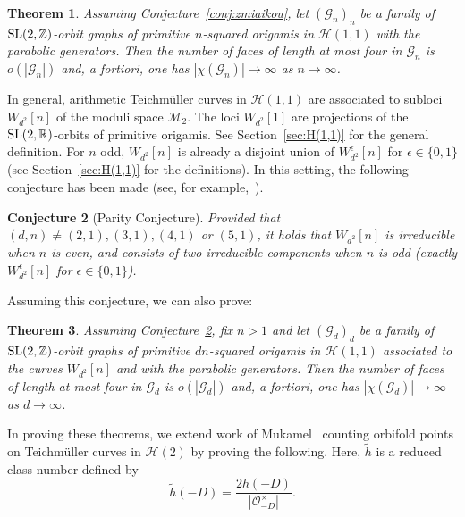 \documentclass[a4paper,11pt]{amsart}
\numberwithin{equation}{section}
\numberwithin{figure}{section}
\numberwithin{table}{section}
\newtheorem{theorem}{Theorem}[section]
\newtheorem{conjecture}[theorem]{Conjecture}
\newcommand{\teichmuller}{Teichm{\"u}ller }
\newcommand{\calH}{\mathcal{H}}
\newcommand{\Z}{\mathbb{Z}}
\newcommand{\R}{\mathbb{R}}
\DeclareMathOperator{\SL}{{\rm{SL}}}
\begin{document}
\begin{theorem}\label{thm:submain-2}
    Assuming Conjecture~\ref{conj:zmiaikou}, let $(\mathcal{G}_{n})_{n}$ be a family of $\SL(2,\Z)$-orbit graphs of primitive $n$-squared origamis in $\mathcal{H}(1,1)$ with the parabolic generators. Then the number of faces of length at most four in $\mathcal{G}_{n}$ is $o(|\mathcal{G}_{n}|)$ and, \emph{a fortiori}, one has $|\chi(\mathcal{G}_{n})|\to\infty$ as $n\to\infty$. 
\end{theorem}

In general, arithmetic \teichmuller curves in $\calH(1,1)$ are associated to subloci $W_{d^2}[n]$ of the moduli space $\mathcal{M}_{2}$. The loci $W_{d^{2}}[1]$ are projections of the $\SL(2,\R)$-orbits of primitive origamis. See Section~\ref{sec:H(1,1)} for the general definition. For $n$ odd, $W_{d^2}[n]$ is already a disjoint union of $W_{d^2}^{\epsilon}[n]$ for $\epsilon\in\{0,1\}$ (see Section~\ref{sec:H(1,1)} for the definitions). In this setting, the following conjecture has been made (see, for example,~\cite[Conjecture 1.1]{Dur}).

\begin{conjecture}[Parity Conjecture]\label{conj:parity}
    Provided that $(d,n) \neq (2,1),(3,1),(4,1)$ or $(5,1)$, it holds that $W_{d^2}[n]$ is irreducible when $n$ is even, and consists of two irreducible components when $n$ is odd (exactly $W_{d^2}^{\epsilon}[n]$ for $\epsilon\in\{0,1\}$).
\end{conjecture}

Assuming this conjecture, we can also prove:

\begin{theorem}\label{thm:submain-3}
    Assuming Conjecture~\ref{conj:parity}, fix $n>1$ and let $(\mathcal{G}_{d})_{d}$ be a family of $\SL(2,\Z)$-orbit graphs of primitive $dn$-squared origamis in $\mathcal{H}(1,1)$ associated to the curves $W_{d^{2}}[n]$ and with the parabolic generators. Then the number of faces of length at most four in $\mathcal{G}_{d}$ is $o(|\mathcal{G}_{d}|)$ and, \emph{a fortiori}, one has $|\chi(\mathcal{G}_{d})|\to\infty$ as $d\to\infty$.
\end{theorem}

In proving these theorems, we extend work of Mukamel~\cite{Muk} counting orbifold points on \teichmuller curves in $\calH(2)$ by proving the following. Here, $\widetilde{h}$ is a reduced class number defined by
\[\tilde{h}(-D) = \frac{2h(-D)}{|\mathcal{O}_{-D}^{\times}|}.\]
\end{document}
